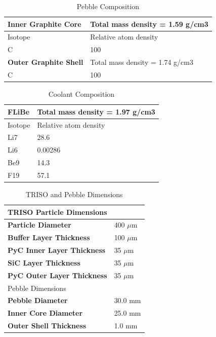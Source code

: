 \begin{table}
  \centering
  \begin{tabular}{|ll|}
    \hline \hline
    \textbf{Inner Graphite Core}	& Total mass density = 1.59 g/cm3 \\
    \hline
    Isotope	& Relative atom density \\
    C	& 100 \\
    \hline \hline
    \textbf{Outer Graphite Shell}	& Total mass density = 1.74 g/cm3 \\
    \hline
    C	& 100 \\
    \hline \hline
  \end{tabular}
  \caption{Pebble Composition}
  \label{tab:pebble_comp}
\end{table}


\begin{table}
  \centering
  \begin{tabular}{|ll|}
    \hline \hline
    \textbf{FLiBe}	      & Total mass density = 1.97 g/cm3 \\
    \hline
    Isotope	              & Relative atom density \\
    Li7	                  & 28.6 \\
    Li6	                  & 0.00286 \\
    Be9	                  & 14.3 \\
    F19	                  & 57.1 \\
    \hline \hline
  \end{tabular}
  \caption{Coolant Composition}
  \label{tab:coolant_comp}
\end{table}

\begin{table}
  \centering
  \begin{tabular}{|ll|}
    \hline \hline
    TRISO Particle Dimensions & \\
    \hline
    \textbf{Particle Diameter}	 & 400 $\mu$m \\
    \textbf{Buffer Layer Thickness} & 100 $\mu$m \\
    \textbf{PyC Inner Layer Thickness}	   & 35 $\mu$m \\
    \textbf{SiC Layer Thickness}	   & 35 $\mu$m \\
    \textbf{PyC Outer Layer Thickness}	     & 35 $\mu$m \\
    \hline \hline
    Pebble Dimensions & \\
    \hline
    \textbf{Pebble Diameter} & 30.0 mm \\
    \textbf{Inner Core Diameter} & 25.0 mm \\
    \textbf{Outer Shell Thickness} & 1.0 mm \\
    \hline \hline
  \end{tabular}
  \caption{TRISO and Pebble Dimensions}
  \label{tab:pebble_dims}
\end{table}

